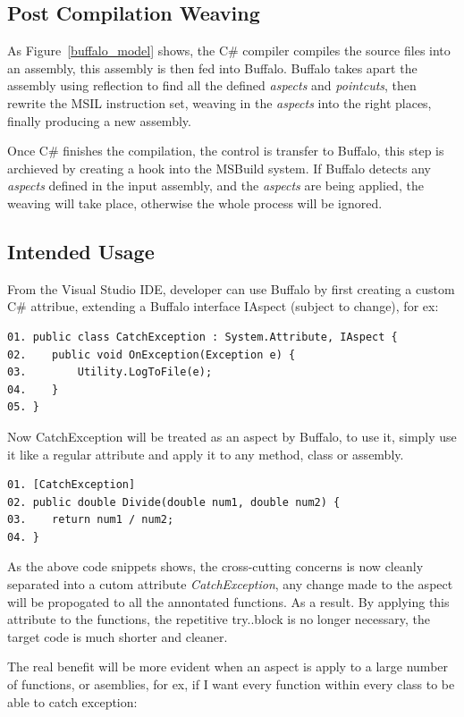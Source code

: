 \subsection{Post Compilation Weaving}
As Figure~\ref{buffalo_model} shows, the C\# compiler compiles the source files into an assembly, this assembly is then fed into Buffalo. Buffalo takes apart the assembly using reflection to find all the defined {\em aspects} and {\em pointcuts}, then rewrite the MSIL instruction set, weaving in the {\em aspects} into the right places, finally producing a new assembly.

Once C\# finishes the compilation, the control is transfer to Buffalo, this step is archieved by creating a hook into the MSBuild system. If Buffalo detects any {\em aspects} defined in the input assembly, and the {\em aspects} are being applied, the weaving will take place, otherwise the whole process will be ignored.

\subsection{Intended Usage}
From the Visual Studio IDE, developer can use Buffalo by first creating a custom C\# attribue, extending a Buffalo interface IAspect (subject to change), for ex:

\begin{verbatim}
01. public class CatchException : System.Attribute, IAspect {
02.    public void OnException(Exception e) {
03.        Utility.LogToFile(e);
04.    } 
05. }
\end{verbatim}

Now CatchException will be treated as an aspect by Buffalo, to use it, simply use it like a regular attribute and apply it to any method, class or assembly.

\begin{verbatim}
01. [CatchException]
02. public double Divide(double num1, double num2) {
03.    return num1 / num2;
04. }
\end{verbatim}

As the above code snippets shows, the cross-cutting concerns is now cleanly separated into a cutom attribute {\em CatchException}, any change made to the aspect will be propogated to all the annontated functions. As a result. By applying this attribute to the functions, the repetitive try..block is no longer necessary, the target code is much shorter and cleaner. 

The real benefit will be more evident when an aspect is apply to a large number of functions, or asemblies, for ex, if I want every function within every class to be able to catch exception:

